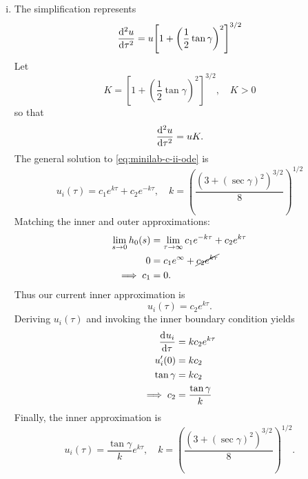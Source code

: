 \documentclass[12pt,twoside]{article}
\begin{document}
\begin{enumerate}[(i)]
\item The simplification represents
  \begin{equation*}
    \od[2]{u}{\tau} = u{\left[ 1 + {\left( \frac{1}{2}\tan\gamma \right)}^2 \right]}^{3/2}
  \end{equation*}
  Let
  \begin{equation*}
    K = {\left[ 1 + {\left( \frac{1}{2}\tan\gamma \right)}^2 \right]}^{3/2}, \quad K>0
  \end{equation*}
  so that
  \begin{equation}
    \label{eq:minilab-c-ii-ode}
    \od[2]{u}{\tau} = uK.
  \end{equation}
  The general solution to \cref{eq:minilab-c-ii-ode} is
  \begin{equation*}
    u_i(\tau) = c_1e^{k \tau} + c_2e^{-k \tau},\quad k={\left(\frac{{(3+(\sec\gamma)^2)}^{3/2}}{8}\right)}^{1/2}
  \end{equation*}
  Matching the inner and outer approximations:
  \begin{equation*}
    \begin{aligned}
      \lim_{s\rightarrow0} h_0(s) &= \lim_{\tau\rightarrow\infty} c_1e^{-k \tau} + c_2e^{k \tau} \\
      0 &= c_1e^{\infty} + \cancel{c_2e^{k \tau}} \\
      \implies c_1 &= 0.
    \end{aligned}
  \end{equation*}
  Thus our current inner approximation is
  \begin{equation*}
    u_i(\tau) = c_2e^{k \tau}.
  \end{equation*}
  Deriving $u_i(\tau)$ and invoking the inner boundary condition yields
  \begin{equation*}
    \begin{aligned}
      \od{u_i}{\tau} &= k c_2e^{k\tau} \\
      u_i'(0) &= k c_2 \\
      \tan\gamma &= k c_2 \\
      \implies c_2 &= \frac{\tan\gamma}{k}
    \end{aligned}
  \end{equation*}
  Finally, the inner approximation is
  \begin{equation*}
    \boxed{u_i(\tau)=\frac{\tan\gamma}{k}e^{k\tau}, \quad k={\left(\frac{{(3+(\sec\gamma)^2)}^{3/2}}{8}\right)}^{1/2}.}
  \end{equation*}
\end{enumerate}
\end{document}
